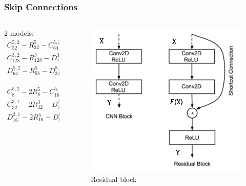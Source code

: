 \documentclass [handout] {beamer}
\begin{document}
\begin{frame}
	\frametitle{Skip Connections}
	\begin{columns}
		\begin{column}{0.4\textwidth}
	2 models:
	\begin{equation}
	\begin{split}
		C_{32}^{5,2} - R_{32}^5 - C_{64}^{5,2} - R_{64}^5 - \\ C_{128}^{3,2} - R_{128}^3 - D_{128}^{3,2} - R_{128}^5 -\\ D_{64}^{5,2} - R_{64}^5 - D_{32}^{8,2} - D_{3,p}^{3,1}
	\end{split}
	\label{ResNet_v1}
	\end{equation}

	\begin{equation}
	\begin{split}
		C_{8}^{5,2} - 2R_{8}^5 - C_{16}^{5,2} - 2R_{16}^5 - \\ C_{32}^{3,1} - 2R_{32}^3 - D_{32}^{3,1} - 2R_{32}^5 -\\ D_{16}^{3,1} - 2R_{16}^5 - D_{8}^{8,1} - D_{3,p}^{3,1} 
	\end{split}
	\label{ResNet_v2}
	\end{equation}
	\end{column}
	\begin{column}{0.4\textwidth}
	\begin{figure}[hbtp]
		\centering
		\includegraphics[scale=0.35]{ResidualBlock.png}
		\caption{Residual block}\label{residual_block}
	\end{figure}
	\end{column}
	\end{columns}
\end{frame}
\end{document}
